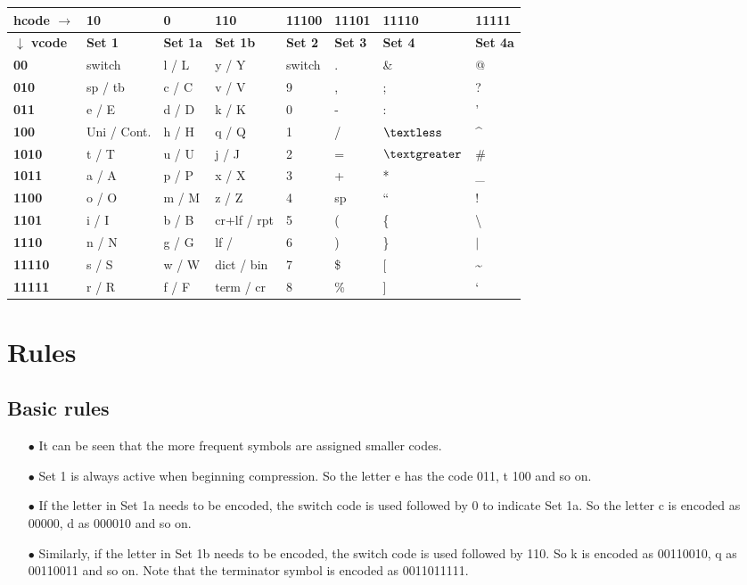 \documentclass[]{article}
\begin{document}
\begin{center}
	\begin{tabular}{ | l | l | l | l | l | l | l | l | } \hline
		\textbf{hcode $\rightarrow$} & \textbf{10} & \textbf{0} & \textbf{110} & \textbf{11100} & \textbf{11101} & \textbf{11110} & \textbf{11111} \\ \hline
		\textbf{$\downarrow$ vcode} & \textbf{Set 1} & \textbf{Set 1a} & \textbf{Set 1b} & \textbf{Set 2} & \textbf{Set 3} & \textbf{Set 4} & \textbf{Set 4a} \\ \hline
		\textbf{00} & switch & l / L & y / Y & switch & . & \& & @ \\ \hline
		\textbf{010} & sp / tb & c / C & v / V & 9 & , & ; & ? \\ \hline
		\textbf{011} & e / E & d / D & k / K & 0 & - & : & ' \\ \hline
		\textbf{100} & Uni / Cont. & h / H & q / Q & 1 & / & $\textless$ & \^{} \\ \hline
		\textbf{1010} & t / T & u / U & j / J & 2 & = & $\textgreater$ & \# \\ \hline
		\textbf{1011} & a / A & p / P & x / X & 3 & + & * & \_ \\ \hline
		\textbf{1100} & o / O & m / M & z / Z & 4 & sp & \textquotedblleft & ! \\ \hline
		\textbf{1101} & i / I & b / B & cr+lf / rpt & 5 & ( & \{ & \textbackslash \\ \hline
		\textbf{1110} & n / N & g / G & lf /  & 6 & ) & \} & $|$ \\ \hline
		\textbf{11110} & s / S & w / W & dict / bin & 7 & \$ & [ & \~{} \\ \hline
		\textbf{11111} & r / R & f / F & term / cr& 8 & \% & ] & ` \\ \hline
	\end{tabular}
\end{center}

\section{Rules}

\subsection{Basic rules}
\begin{itemize}
	\item[$\bullet$] It can be seen that the more frequent symbols are assigned smaller codes.
	\item[$\bullet$] Set 1 is always active when beginning compression.  So the letter e has the code 011, t 100 and so on.
	\item[$\bullet$] If the letter in Set 1a needs to be encoded, the switch code is used followed by 0 to indicate Set 1a.  So the letter c is encoded as 00000, d as 000010 and so on.
	\item[$\bullet$] Similarly, if the letter in Set 1b needs to be encoded, the switch code is used followed by 110. So k is encoded as 00110010, q as 00110011 and so on. Note that the terminator symbol is encoded as 0011011111.
\end{itemize}
\end{document}
